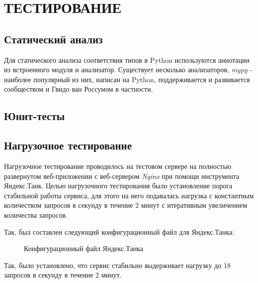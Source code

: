 \section{ТЕСТИРОВАНИЕ}
    \subsection{Статический анализ}
    Для статического анализа соответствия типов в Python используются аннотации 
    из встроенного модуля  и анализатор.
    Существует несколько анализаторов, \textit{mypy} - наиболее популярный из них,
    написан на Python, поддерживается и развивается сообществом
    и Гвидо ван Россумом в частности.

    \subsection{Юнит-тесты}

    \subsection{Нагрузочное тестирование}
    Нагрузочное тестирование проводилось на тестовом сервере на полностью
    развернутом веб-приложении с веб-сервером \textit{Nginx} при помощи
    инструмента Яндекс.Танк. Целью нагрузочного тестирования было установление
    порога стабильной работы сервиса, для этого на него подавалась нагрузка
    с константным количеством запросов в секунду в течение 2 минут с итеративным
    увеличением количества запросов.

    Так, был составлен следующий конфигурационный файл для Яндекс.Танка:
    \begin{figure}[H]
        \centering
        
        \caption{Конфигурационный файл Яндекс.Танка}
        \label{fig:tank_load}
    \end{figure}

    Так, было установлено, что сервис стабильно выдерживает нагрузку до 18
    запросов в секунду в течение 2 минут.
